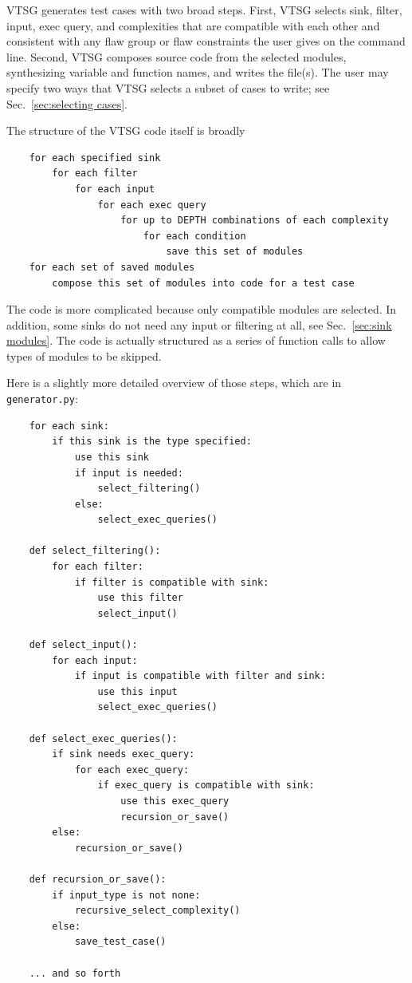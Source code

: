 VTSG generates test cases with two broad steps.  First, VTSG selects sink,
filter, input, exec query, and complexities that are compatible with each other
and consistent with any flaw group or flaw constraints the user gives on the
command line.  Second, VTSG composes source code from the selected modules,
synthesizing variable and function names, and writes the file(s).  The user may
specify two ways that VTSG selects a subset of cases to write; see
Sec.~\ref{sec:selecting cases}.

The structure of the VTSG code itself is broadly
\begin{verbatim}
    for each specified sink
        for each filter
            for each input
                for each exec query
                    for up to DEPTH combinations of each complexity
                        for each condition
                            save this set of modules
    for each set of saved modules
        compose this set of modules into code for a test case
\end{verbatim}
The code is more complicated because only compatible modules are
selected.
In addition, some sinks do not need any input or filtering at all,
see Sec.~\ref{sec:sink modules}.
The code is actually structured as a series of function calls to allow types
of modules to be skipped.

Here is a slightly more detailed
overview of those steps, which are in \verb|generator.py|:
\begin{verbatim}
    for each sink:
        if this sink is the type specified:
            use this sink
            if input is needed:
                select_filtering()
            else:
                select_exec_queries()

    def select_filtering():
        for each filter:
            if filter is compatible with sink:
                use this filter
                select_input()

    def select_input():
        for each input:
            if input is compatible with filter and sink:
                use this input
                select_exec_queries()

    def select_exec_queries():
        if sink needs exec_query:
            for each exec_query:
                if exec_query is compatible with sink:
                    use this exec_query
                    recursion_or_save()
        else:
            recursion_or_save()

    def recursion_or_save():
        if input_type is not none:
            recursive_select_complexity()
        else:
            save_test_case()

    ... and so forth
\end{verbatim}


